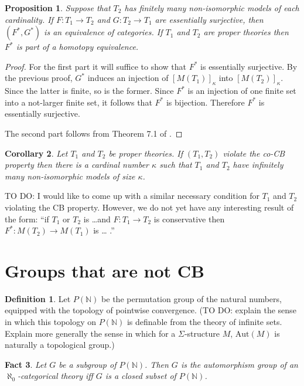 \documentclass[12pt]{article}
\newtheorem{prop}{Proposition}
\newtheorem{fact}[prop]{Fact}
\newtheorem{cor}[prop]{Corollary}
\theoremstyle{definition}
\newtheorem*{defn}{Definition}
\theoremstyle{remark}
\newcommand{\3}{\mathcal}
\begin{document}
\begin{prop} Suppose that $T_2$ has finitely many non-isomorphic
  models of each cardinality. If $F:T_1\to T_2$ and $G:T_2\to T_1$ are
  essentially surjective, then $(F^*,G^*)$ is an equivalence of
  categories. If $T_1$ and $T_2$ are proper theories then $F^*$ is
  part of a homotopy equivalence. \end{prop}

\begin{proof} For the first part it will suffice to show that $F^*$ is
  essentially surjective. By the previous proof, $G^*$ induces an
  injection of $[M(T_1)]_\kappa$ into $[M(T_2)]_\kappa$. Since the
  latter is finite, so is the former. Since $F^*$ is an injection of
  one finite set into a not-larger finite set, it follows that $F^*$
  is bijection. Therefore $F^*$ is essentially surjective.

  The second part follows from Theorem 7.1 of
  \citep{summer2020}. \end{proof}

\begin{cor} Let $T_1$ and $T_2$ be proper theories. If $(T_1,T_2)$
  violate the co-CB property then there is a cardinal number $\kappa$
  such that $T_1$ and $T_2$ have infinitely many non-isomorphic models
  of size $\kappa$. \end{cor}

TO DO: I would like to come up with a similar necessary condition for
$T_1$ and $T_2$ violating the CB property. However, we do not yet have
any interesting result of the form: ``if $T_1$ or $T_2$ is \dots and
$F:T_1\to T_2$ is conservative then $F^*:M(T_2)\to M(T_1)$ is \dots
.''



\section{Groups that are not CB}

\begin{defn} Let $P(\mathbb{N})$ be the permutation group of the
  natural numbers, equipped with the topology of pointwise
  convergence. (TO DO: explain the sense in which this topology on
  $P(\mathbb{N})$ is definable from the theory of infinite
  sets. Explain more generally the sense in which for a
  $\Sigma$-structure $M$, $\mathrm{Aut}(M)$ is naturally a topological
  group.) \end{defn}

\begin{fact} Let $G$ be a subgroup of $P(\mathbb{N})$. Then $G$ is the
  automorphism group of an $\aleph _0$-categorical theory iff $G$ is
  a closed subset of $P(\mathbb{N})$. \end{fact}
\end{document}
